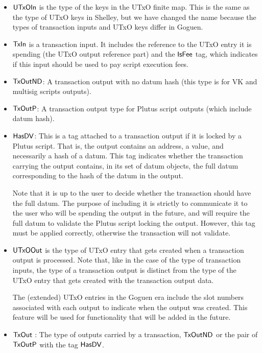 \begin{itemize}
  \item $\mathsf{UTxOIn}$ is the type of the keys in the UTxO finite map. This
  is the same as the type of UTxO keys in Shelley, but we have changed
  the name because the types of transaction inputs and UTxO keys
  differ in Goguen.

  \item $\mathsf{TxIn}$ is a transaction input. It includes the reference to the UTxO entry it is spending
  (the UTxO output reference part) and the $\mathsf{IsFee}$ tag, which indicates if this input should
  be used to pay script execution fees.

  \item $\mathsf{TxOutND}$: A transaction output with no datum hash
  (this type is for VK and multisig scripts outputs).

  \item $\mathsf{TxOutP}$: A transaction output type for Plutus
  script outputs (which include datum hash).

  \item $\mathsf{HasDV}$:
  This is a tag attached to a transaction output if it is locked by a Plutus
  script. That is, the output contains an address, a value, and necessarily a
  hash of a datum.
  This tag indicates whether the transaction carrying the output
  contains, in its set of datum objects, the full datum corresponding
  to the hash of the datum in the output.

  Note that it is up to the user
  to decide whether the transaction should have the full datum. The purpose of
  including it is strictly to communicate it to the user who will be spending
  the output in the future, and will require the full datum to validate
  the Plutus script locking the output. However, this tag must be applied
  correctly, otherwise the transaction will not validate.

  \item $\mathsf{UTxOOut}$ is the type of UTxO entry that gets created when a transaction
  output is processed. Note that, like in the case of the type of transaction inputs,
  the type of a transaction output is distinct from the type of the
  UTxO entry that gets created with the transaction output data.

  The (extended) UTxO entries in the Goguen era include the slot numbers associated with each output
  to indicate when the output was created.
  This feature will be used for functionality that will be added in the future.

  \item $\mathsf{TxOut}$ : The type of outputs carried by a transaction,
  $\mathsf{TxOutND}$ or the pair of $\mathsf{TxOutP}$ with the tag $\mathsf{HasDV}$.


\end{itemize}
